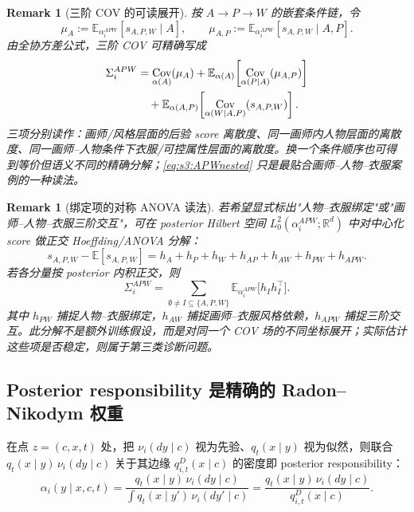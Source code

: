 \documentclass[11pt,a4paper]{article}
\newtheorem{remark}[theorem]{Remark}
\DeclareMathOperator{\Cov}{Cov}
\newcommand{\E}{\mathbb{E}}
\newcommand{\R}{\mathbb{R}}
\begin{document}
\begin{remark}[三阶 COV 的可读展开]\label{rem:s3:APWexpand}
按 $A\to P\to W$ 的嵌套条件链，令
\[
\mu_A:=\E_{\alpha_i^{APW}}[s_{A,P,W}\mid A],
\qquad
\mu_{A,P}:=\E_{\alpha_i^{APW}}[s_{A,P,W}\mid A,P].
\]
由全协方差公式，三阶 COV 可精确写成
\begin{align}
\Sigma_i^{APW}
&=
\Cov_{\alpha(A)}(\mu_A)
+
\E_{\alpha(A)}\!\left[
\Cov_{\alpha(P\mid A)}(\mu_{A,P})
\right] \notag\\
&\quad+
\E_{\alpha(A,P)}\!\left[
\Cov_{\alpha(W\mid A,P)}(s_{A,P,W})
\right].
\label{eq:s3:APWnested}
\end{align}
三项分别读作：画师/风格层面的后验 score 离散度、同一画师内人物层面的离散度、同一画师--人物条件下衣服/可控属性层面的离散度。换一个条件顺序也可得到等价但语义不同的精确分解；\eqref{eq:s3:APWnested} 只是最贴合画师--人物--衣服案例的一种读法。
\end{remark}

\begin{remark}[绑定项的对称 ANOVA 读法]\label{rem:s3:APWanova}
若希望显式标出"人物--衣服绑定"或"画师--人物--衣服三阶交互"，可在 posterior Hilbert 空间 $L^2_0(\alpha_i^{APW};\R^d)$ 中对中心化 score 做正交 Hoeffding/ANOVA 分解：
\begin{equation}\label{eq:s3:APWanova}
s_{A,P,W}-\E[s_{A,P,W}]
=h_A+h_P+h_W+h_{AP}+h_{AW}+h_{PW}+h_{APW}.
\end{equation}
若各分量按 posterior 内积正交，则
\begin{equation}\label{eq:s3:APWanovaCov}
\Sigma_i^{APW}
=
\sum_{\emptyset\ne I\subseteq\{A,P,W\}}
\E_{\alpha_i^{APW}}\!\big[h_Ih_I^\top\big].
\end{equation}
其中 $h_{PW}$ 捕捉人物--衣服绑定，$h_{AW}$ 捕捉画师--衣服风格依赖，$h_{APW}$ 捕捉三阶交互。此分解不是额外训练假设，而是对同一个 COV 场的不同坐标展开；实际估计这些项是否稳定，则属于第三类诊断问题。
\end{remark}

\subsection{Posterior responsibility 是精确的 Radon--Nikodym 权重}\label{subsec:s3:resp}

在点 $z=(c,x,t)$ 处，把 $\nu_i(dy\mid c)$ 视为先验、$q_t(x\mid y)$ 视为似然，则联合 $q_t(x\mid y)\,\nu_i(dy\mid c)$ 关于其边缘 $q_{i,t}^{D}(x\mid c)$ 的密度即 posterior responsibility：
\begin{equation}\label{eq:s3:alpha}
\alpha_i(y\mid x,c,t)=\frac{q_t(x\mid y)\,\nu_i(dy\mid c)}{\displaystyle\int q_t(x\mid y')\,\nu_i(dy'\mid c)}
=\frac{q_t(x\mid y)\,\nu_i(dy\mid c)}{q_{i,t}^{D}(x\mid c)}.
\end{equation}
\end{document}
